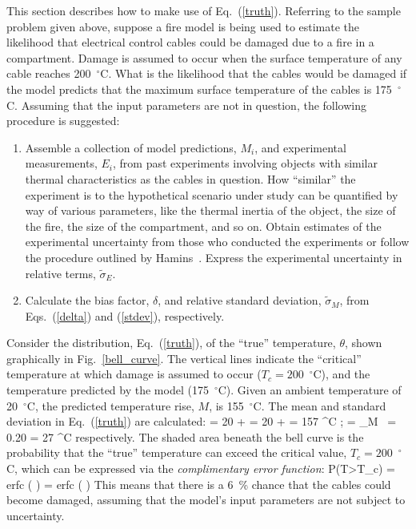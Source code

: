 This section describes how to make use of Eq.~(\ref{truth}). Referring to the sample problem given above, suppose a fire model is being used to estimate the likelihood that
electrical control cables could be damaged due to a fire in a compartment.
Damage is assumed to occur when the surface temperature of any cable reaches 200~$^\circ$C.
What is the likelihood that the cables would be damaged if the
model predicts that the maximum surface temperature of the cables is 175~$^\circ$C. Assuming that the input parameters are not in question, the following
procedure is suggested:
\begin{enumerate}
\item Assemble a collection of model predictions, $M_i$, and experimental measurements, $E_i$, from
past experiments involving objects with similar thermal characteristics as the cables in question.
How ``similar'' the experiment is to the hypothetical scenario under study can be quantified by way of
various parameters, like the thermal inertia of the object, the size of the fire, the size of the compartment, and so on. Obtain estimates of the
experimental uncertainty from those who conducted the experiments or follow the procedure outlined by Hamins~\cite{NUREG_1824_Sup_1}. Express the
experimental uncertainty in relative terms, $\widetilde{\sigma}_E$.
\item Calculate the bias factor, $\delta$, and relative standard deviation, $\tilde{\sigma}_M$, from Eqs.~(\ref{delta}) and (\ref{stdev}), respectively.
\end{enumerate}
Consider the distribution, Eq.~(\ref{truth}), of the ``true'' temperature, $\theta$, shown graphically in Fig.~\ref{bell_curve}.
The vertical lines indicate the ``critical'' temperature at which damage is assumed to occur ($T_c=200$~$^\circ$C), and the temperature predicted by the
model (175~$^\circ$C). Given an ambient temperature of 20~$^\circ$C, the predicted temperature rise, $M$, is 155~$^\circ$C.
The mean and standard deviation in Eq.~(\ref{truth}) are calculated:
\be \mu = 20 +  = 20 +  = 157 \; ^\circ \hbox{C}  \quad ; \quad
   \sigma = \widetilde{\sigma}_M \,  = 0.20 \times {} = 27 \; ^\circ \hbox{C}  \ee
respectively. The shaded area beneath the bell curve is the probability that the ``true'' temperature can exceed the
critical value, $T_c=200$~$^\circ$C, which can be expressed via the {\em complimentary error function}:
\be P(T>T_c) =  \hbox{erfc} \left(  \right) =  \hbox{erfc} \left(  \right)   \ee
This means that there is a 6~\% chance that the cables could become damaged, assuming that the model's input parameters are not
subject to uncertainty.


